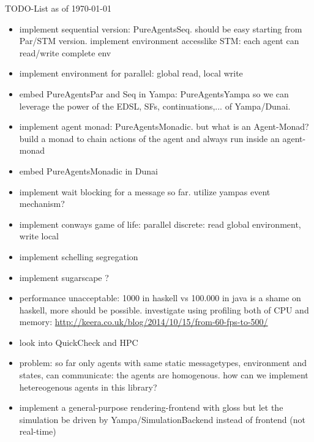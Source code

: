 TODO-List as of \today

\begin{itemize}
\item implement sequential version: PureAgentsSeq. should be easy starting from Par/STM version. implement environment accesslike STM: each agent can read/write complete env

\item implement environment for parallel: global read, local write


\item embed PureAgentsPar and Seq in Yampa: PureAgentsYampa so we can leverage the power of the EDSL, SFs, continuations,... of Yampa/Dunai.
\item implement agent monad: PureAgentsMonadic. but what is an Agent-Monad? build a monad to chain actions of the agent and always run inside an agent-monad
\item embed PureAgentsMonadic in Dunai

\item implement wait blocking for a message so far. utilize yampas event mechanism?

\item implement conways game of life: parallel discrete: read global environment, write local
\item implement schelling segregation
\item implement sugarscape ?

\item performance unacceptable: 1000 in haskell vs 100.000 in java is a shame on haskell, more should be possible. investigate using profiling both of CPU and memory: \url{http://keera.co.uk/blog/2014/10/15/from-60-fps-to-500/}
\item look into QuickCheck and HPC
\item problem: so far only agents with same static messagetypes, environment and states, can communicate: the agents are homogenous. how can we implement hetereogenous agents in this library?
\item implement a general-purpose rendering-frontend with gloss but let the simulation be driven by Yampa/SimulationBackend instead of frontend (not real-time)



\end{itemize}
